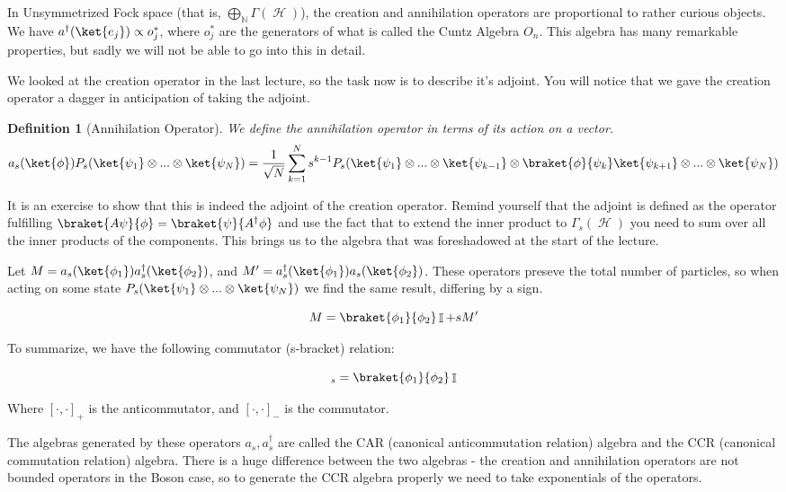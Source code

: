 \documentclass{article}
\DeclareMathOperator{\Hh}{{\mathcal{H}}}
\DeclareMathOperator{\NN}{\mathbb{N}}
\DeclareMathOperator{\II}{\mathbb{I}}
\newcommand{\create}[1]{a^\dagger_s(#1)}
\newcommand{\annih}[1]{a_s(#1)}
\newtheorem{defn}{Definition}
\begin{document}
In Unsymmetrized Fock space (that is, $\bigoplus_{\NN} \Gamma(\Hh)$), the creation and annihilation operators are proportional to rather curious objects. We have $a^\dagger(\ket{e_j}) \propto o^*_j$, where $o_j^*$ are the generators of what is called the Cuntz Algebra $O_n$. This algebra has many remarkable properties, but sadly we will not be able to go into this in detail.

We looked at the creation operator in the last lecture, so the task now is to describe it's adjoint. You will notice that we gave the creation operator a dagger in anticipation of taking the adjoint. 

\begin{defn}[Annihilation Operator] We define the annihilation operator in terms of its action on a vector.
\begin{equation}
a_s(\ket{\phi})P_s(\ket{\psi_1}\otimes...\otimes\ket{\psi_N})
= \frac{1}{\sqrt{N}}\sum_{k=1}^N s^{k-1} P_s(\ket{\psi_1}\otimes...\otimes\ket{\psi_{k-1}}\otimes\braket{\phi}{\psi_k}\ket{\psi_{k+1}}\otimes...\otimes\ket{\psi_N})
\end{equation}
\end{defn}

It is an exercise to show that this is indeed the adjoint of the creation operator. Remind yourself that the adjoint is defined as the operator fulfilling $\braket{A\psi}{\phi}=\braket{\psi}{A^\dagger \phi}$ and use the fact that to extend the inner product to $\Gamma_s(\Hh)$ you need to sum over all the inner products of the components. This brings us to the algebra that was foreshadowed at the start of the lecture.

Let $M = \annih{\ket{\phi_1}}\create{\ket{\phi_2}}$, and $M'=\create{\ket{\phi_1}}\annih{\ket{\phi_2}}$. These operators preseve the total number of particles, so when acting on some state $P_s(\ket{\psi_1}\otimes...\otimes\ket{\psi_N})$ we find the same result, differing by a sign.

\[M=\braket{\phi_1}{\phi_2}\II+sM'\]

To summarize, we have the following commutator (s-bracket) relation:

\begin{equation}
[\create{\ket{\phi_1}},\annih{\ket{\phi_2}}]_s=\braket{\phi_1}{\phi_2}\II
\end{equation}

Where $[\cdot,\cdot]_+$ is the anticommutator, and $[\cdot,\cdot]_-$ is the commutator.

The algebras generated by these operators $a_s,a^\dagger_s$ are called the CAR (canonical anticommutation relation) algebra and the CCR (canonical commutation relation) algebra. There is a huge difference between the two algebras - the creation and annihilation operators are not bounded operators in the Boson case, so to generate the CCR algebra properly we need to take exponentials of the operators. 
\end{document}
